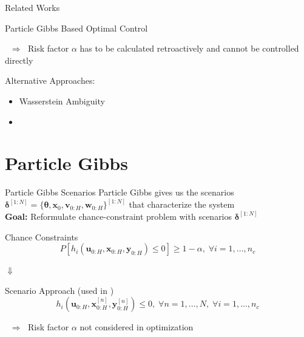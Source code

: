 \documentclass[student, noshadow, itr, english, aspectratio=169]{ITR_LSR_slides}
\begin{document}
\begin{frame}{Related Works}

Particle Gibbs Based Optimal Control \textbf{\cite[4]{Robert_24}}

$\;\; \Rightarrow \;$ Risk factor $\alpha$ has to be calculated retroactively and cannot be controlled directly

\vspace{.4cm}

Alternative Approaches:
\begin{itemize}
\item Wasserstein Ambiguity \cite[4]{Hota_19}
\item {} \cite[4]{Adam_22} \\
\makebox[3cm]{\hfill}  \textbf{\cite[4]{Yassine_22}}
\end{itemize}
\end{frame}


\section{Particle Gibbs}

\begin{frame}{Particle Gibbs Scenarios}
Particle Gibbs gives us the scenarios $\boldsymbol{\delta}^{[1:N]} = \{ \boldsymbol{\theta}, \boldsymbol{x}_0, \boldsymbol{v}_{0:H}, \boldsymbol{w}_{0:H}\}^{[1:N]}$ that characterize the system\\

\textbf{Goal:} Reformulate chance-constraint problem with scenarios $\boldsymbol{\delta}^{[1:N]}$

\begin{block}{Chance Constraints}
	\begin{equation*}
		P \left[ h_i(\boldsymbol{u}_{0:H},  \boldsymbol{x}_{0:H},  \boldsymbol{y}_{0:H}) \leq 0 \right] \geq 1 - \alpha, \; \forall i = 1,...,n_c
	\end{equation*}
\end{block}	

\makebox[6.7cm]{\hfill} $\boldsymbol{\Downarrow}$ 

\begin{block}{Scenario Approach (used in \cite{Robert_24})}
	\begin{equation*}
		 h_i(\boldsymbol{u}_{0:H},  \boldsymbol{x}_{0:H}^{[n]},  \boldsymbol{y}_{0:H}^{[n]}) \leq 0, \; \forall n = 1, ..., N, \; \forall i = 1,...,n_c
	\end{equation*}
\end{block}

$\;\; \Rightarrow \;$ Risk factor $\alpha$ not considered in optimization




\end{frame}
\end{document}

